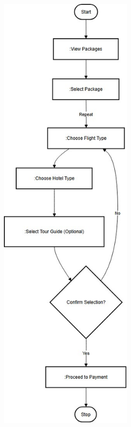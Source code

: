 \vspace{0.5cm}
\begin{center}
\includegraphics[width=0.5\textwidth]{./figures/Activity Diagram/2_activity.jpg} %
\end{center}
\vspace{0.5cm}


